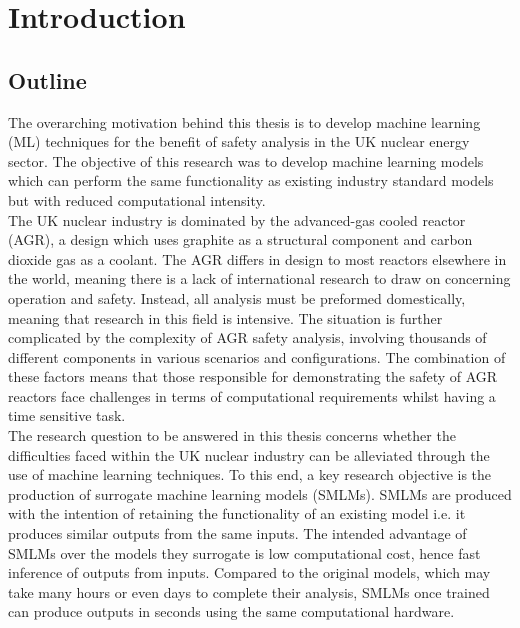 \chapter{Introduction}
\label{cha:intro}

\section{Outline}


The overarching motivation behind this thesis is to develop machine learning (ML) techniques for the benefit of safety analysis in the UK nuclear energy sector. The objective of this research was to develop machine learning models which can perform the same functionality as existing industry standard models but with reduced computational intensity.  
\\ 

\noindent
The UK nuclear industry is dominated by the advanced-gas cooled reactor (AGR), a design which uses graphite as a structural component and carbon dioxide gas as a coolant. The AGR differs in design to most reactors elsewhere in the world, meaning there is a lack of international research to draw on concerning operation and safety. Instead, all analysis must be preformed domestically, meaning that research in this field is intensive. The situation is further complicated by the complexity of AGR safety analysis, involving thousands of different components in various scenarios and configurations. The combination of these factors means that those responsible for demonstrating the safety of AGR reactors face challenges in terms of computational requirements whilst having a time sensitive task. 
\\ 

\noindent
The research question to be answered in this thesis concerns whether the difficulties faced within the UK nuclear industry can be alleviated through the use of machine learning techniques. To this end, a key research objective is the production of surrogate machine learning models (SMLMs). SMLMs are produced with the intention of retaining the functionality of an existing model i.e. it produces similar outputs from the same inputs. The intended advantage of SMLMs over the models they surrogate is low computational cost, hence fast inference of outputs from inputs. Compared to the original models, which may take many hours or even days to complete their analysis, SMLMs once trained can produce outputs in seconds using the same computational hardware. 
\\ 

